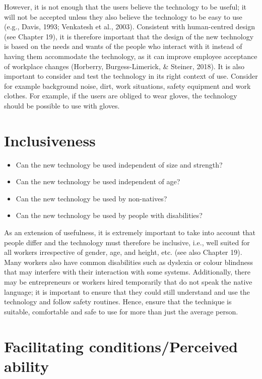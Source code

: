 \documentclass[
  12pt,
]{scrbook}
\begin{document}
However, it is not enough that the users believe the technology to be useful; it will not be accepted unless they also believe the technology to be easy to use (e.g., Davis, 1993; Venkatesh et al., 2003). Consistent with human-centred design (see Chapter 19), it is therefore important that the design of the new technology is based on the needs and wants of the people who interact with it instead of having them accommodate the technology, as it can improve employee acceptance of workplace changes (Horberry, Burgess-Limerick, \& Steiner, 2018). It is also important to consider and test the technology in its right context of use. Consider for example background noise, dirt, work situations, safety equipment and work clothes. For example, if the users are obliged to wear gloves, the technology should be possible to use with gloves.~

\hypertarget{inclusiveness}{%
\section*{Inclusiveness}\label{inclusiveness}}

\begin{itemize}
\item
  Can the new technology be used independent of size and strength?
\item
  Can the new technology be used independent of age?
\item
  Can the new technology be used by non-natives?
\item
  Can the new technology be used by people with disabilities?~
\end{itemize}

As an extension of usefulness, it is extremely important to take into account that people differ and the technology must therefore be inclusive, i.e., well suited for all workers irrespective of gender, age, and height, etc. (see also Chapter 19). Many workers also have common disabilities such as dyslexia or colour blindness that may interfere with their interaction with some systems. Additionally, there may be entrepreneurs or workers hired temporarily that do not speak the native language; it is important to ensure that they could still understand and use the technology and follow safety routines. Hence, ensure that the technique is suitable, comfortable and safe to use for more than just the average person.

\hypertarget{facilitating-conditionsperceived-ability}{%
\section*{Facilitating conditions/Perceived ability}\label{facilitating-conditionsperceived-ability}}
\end{document}
